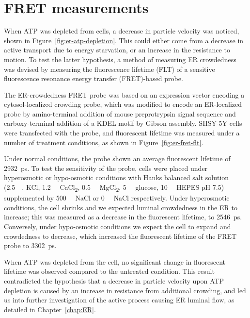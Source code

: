 \section{FRET measurements} \label{appn:fret}
When ATP was depleted from cells, a decrease in particle velocity was noticed, shown in Figure~\ref{fig:er-atp-depletion}. 
This could either come from a decrease in active transport due to energy starvation, or an increase in the resistance to motion. 
To test the latter hypothesis, a method of measuring ER crowdedness was devised by measuring the fluorescence lifetime (FLT) of a sensitive fluorescence resonance energy transfer (FRET)-based probe. 

The ER-crowdedness FRET probe was based on an expression vector encoding a cytosol-localized crowding probe, which was modified to encode an ER-localized probe by amino-terminal addition of mouse preprotrypsin signal sequence and carboxy-terminal addition of a KDEL motif by Gibson assembly. 
SHSY-5Y cells were transfected with the probe, and fluorescent lifetime was measured under a number of treatment conditions, as shown in Figure~\ref{fig:er-fret-flt}. 

Under normal conditions, the probe shown an average fluorescent lifetime of \SI{2932}{\pico\second}. 
To test the sensitivity of the probe, cells were placed under hyperosmotic or hypo-osmotic conditions with Hanks balanced salt solution (\SI{2.5}{\milli\Molar}, KCl, \SI{1.2}{\milli\Molar} CaCl\textsubscript{2}, \SI{0.5}{\milli\Molar} MgCl\textsubscript{2}, \SI{5}{\milli\Molar} glucose, \SI{10}{\milli\Molar} HEPES pH 7.5) supplemented by \SI{500}{\milli\Molar} NaCl or \SI{0}{\milli\Molar} NaCl respectively. 
Under hyperosmotic conditions, the cell shrinks and we expected luminal crowdedness in the ER to increase; this was measured as a decrease in the fluorescent lifetime, 
to \SI{2546}{\pico\second}. 
Conversely, under hypo-osmotic conditions we expect the cell to expand and crowdedness to decrease, which increased the fluorescent lifetime of the FRET probe to \SI{3302}{\pico\second}. 

When ATP was depleted from the cell, no significant change in fluorescent lifetime was observed compared to the untreated condition. 
This result contradicted the hypothesis that a decrease in particle velocity upon ATP depletion is caused by an increase in resistance from additional crowding, and led us into further investigation of the active process causing ER luminal flow, as detailed in Chapter~\ref{chap:ER}. 

